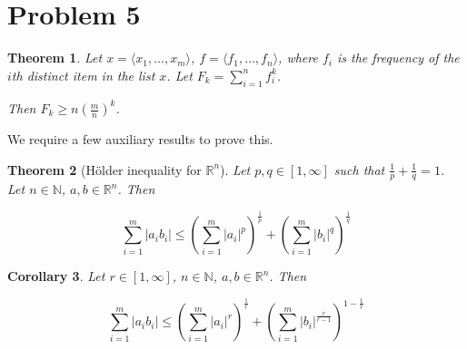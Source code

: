 \documentclass[11pt]{amsart}
\newtheorem{theorem}{Theorem}[section]
\newtheorem{corollary}[theorem]{Corollary}
\begin{document}
\section*{Problem 5}
\addtocounter{section}{1}
\setcounter{theorem}{0}

\begin{theorem}Let $x = \langle x_1, \dots, x_m \rangle$, $f = \langle f_1, \dots, f_n \rangle$, where $f_i$ is the frequency of the $i$th distinct item in the list $x$. Let $F_k = \sum_{i=1}^n f_i^k$.

Then $F_k \ge n \left(\frac{m}{n}\right)^k$.
\end{theorem}

We require a few auxiliary results to prove this.

\begin{theorem}[Hölder inequality for $\mathbb{R}^n$] Let $p, q \in [1, \infty]$ such that $\frac{1}{p} + \frac{1}{q} = 1$. Let $n \in \mathbb{N}$, $a, b \in \mathbb{R}^n$. Then

$$
\sum_{i=1}^m |a_i b_i| \le \left(\sum_{i=1}^m |a_i|^p\right)^{\frac{1}{p}} + \left(\sum_{i=1}^m |b_i|^q\right)^{\frac{1}{q}}
$$
\end{theorem}

\begin{corollary}\label{cor1}
Let $r \in [1, \infty]$, $n \in \mathbb{N}$, $a, b \in \mathbb{R}^n$. Then

$$
\sum_{i=1}^m |a_i b_i| \le \left(\sum_{i=1}^m |a_i|^r\right)^{\frac{1}{r}} + \left(\sum_{i=1}^m |b_i|^{\frac{r}{r-1}}\right)^{1 - \frac{1}{r}}
$$
\end{corollary}
\end{document}
